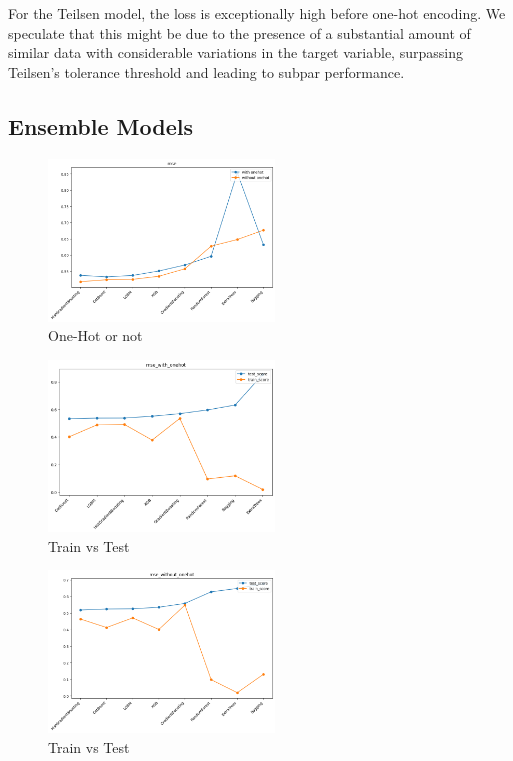 \documentclass[twocolumn]{article}
\begin{document}
For the Teilsen model, the loss is exceptionally high before one-hot encoding. We speculate that this might be due to the presence of a substantial amount of similar data with considerable variations in the target variable, surpassing Teilsen's tolerance threshold and leading to subpar performance.
	\subsection{Ensemble Models}
		\begin{figure}[H]
		\centering
		\includegraphics[width=6cm]{ensemble_mse.png} 
		\caption{One-Hot or not} 
		\label{Fig.ensemble_mse} 
		\end{figure}
		\begin{figure}[H]
		\centering
		\includegraphics[width=6cm]{ensemble_mse_loss_wi.png} 
		\caption{Train vs Test} 
		\label{Fig.svm_loss} 
		\end{figure}
		\begin{figure}[H]
		\centering
		\includegraphics[width=6cm]{ensemble_mse_loss_wh.png} 
		\caption{Train vs Test} 
		\label{Fig.svm_loss} 
		\end{figure}
\end{document}
